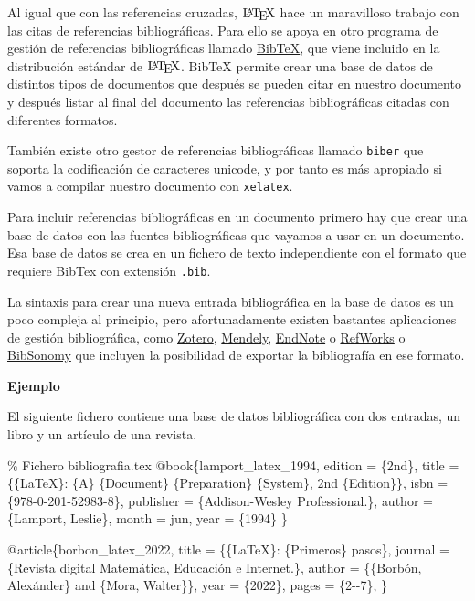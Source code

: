 \documentclass[
  a4paper,
]{scrreport}
\newenvironment{Shaded}{\begin{snugshade}}{\end{snugshade}}
\newcommand{\CommentTok}[1]{\textcolor[rgb]{0.37,0.37,0.37}{#1}}
\newcommand{\NormalTok}[1]{\textcolor[rgb]{0.00,0.23,0.31}{#1}}
\begin{document}
Al igual que con las referencias cruzadas, \(\text{\LaTeX}\) hace un
maravilloso trabajo con las citas de referencias bibliográficas. Para
ello se apoya en otro programa de gestión de referencias bibliográficas
llamado \href{http://www.bibtex.org/}{BibTeX}, que viene incluido en la
distribución estándar de \(\text{\LaTeX}\). BibTeX permite crear una
base de datos de distintos tipos de documentos que después se pueden
citar en nuestro documento y después listar al final del documento las
referencias bibliográficas citadas con diferentes formatos.

También existe otro gestor de referencias bibliográficas llamado
\texttt{biber} que soporta la codificación de caracteres unicode, y por
tanto es más apropiado si vamos a compilar nuestro documento con
\texttt{xelatex}.

Para incluir referencias bibliográficas en un documento primero hay que
crear una base de datos con las fuentes bibliográficas que vayamos a
usar en un documento. Esa base de datos se crea en un fichero de texto
independiente con el formato que requiere BibTex con extensión
\texttt{.bib}.

La sintaxis para crear una nueva entrada bibliográfica en la base de
datos es un poco compleja al principio, pero afortunadamente existen
bastantes aplicaciones de gestión bibliográfica, como
\href{https://www.zotero.org/}{Zotero},
\href{https://www.mendeley.com/}{Mendely},
\href{https://endnote.com/}{EndNote} o
\href{https://refworks.proquest.com/researcher/}{RefWorks} o
\href{https://www.bibsonomy.org/}{BibSonomy} que incluyen la posibilidad
de exportar la bibliografía en ese formato.

\textbf{Ejemplo}

El siguiente fichero contiene una base de datos bibliográfica con dos
entradas, un libro y un artículo de una revista.

\begin{Shaded}
\begin{Highlighting}[]
\CommentTok{\% Fichero bibliografia.tex}
\NormalTok{@book\{lamport\_latex\_1994,}
\NormalTok{    edition = \{2nd\},}
\NormalTok{    title = \{\{LaTeX\}: \{A\} \{Document\} \{Preparation\} \{System\}, 2nd \{Edition\}\},}
\NormalTok{    isbn = \{978{-}0{-}201{-}52983{-}8\},}
\NormalTok{    publisher = \{Addison{-}Wesley Professional.\},}
\NormalTok{    author = \{Lamport, Leslie\},}
\NormalTok{    month = jun,}
\NormalTok{    year = \{1994\}}
\NormalTok{\}}

\NormalTok{@article\{borbon\_latex\_2022,}
\NormalTok{    title = \{\{LaTeX\}: \{Primeros\} pasos\},}
\NormalTok{    journal = \{Revista digital Matemática, Educación e Internet.\},}
\NormalTok{    author = \{\{Borbón, Alexánder\} and \{Mora, Walter\}\},}
\NormalTok{    year = \{2022\},}
\NormalTok{    pages = \{2{-}{-}7\},}
\NormalTok{\}}
\end{Highlighting}
\end{Shaded}
\end{document}

